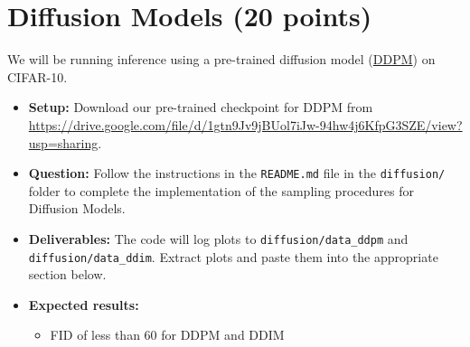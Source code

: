 \documentclass[11pt,addpoints,answers]{exam}
\numberwithin{equation}{section} %
\numberwithin{figure}{section} %
\numberwithin{table}{section} %
\begin{document}
\section{Diffusion Models (20 points)}
We will be running inference using a pre-trained diffusion model (\href{https://arxiv.org/abs/2006.11239}{DDPM}) on CIFAR-10. 
\begin{itemize}
\item \textbf{Setup:} Download our pre-trained checkpoint for DDPM from \href{https://drive.google.com/file/d/1gtn9Jv9jBUol7iJw-94hw4j6KfpG3SZE/view?usp=sharing}{https://drive.google.com/file/d/1gtn9Jv9jBUol7iJw-94hw4j6KfpG3SZE/view?usp=sharing}.
\item \textbf{Question:} Follow the instructions in the \texttt{README.md} file in the \texttt{diffusion/} folder to complete the implementation of the sampling procedures for Diffusion Models.
\item \textbf{Deliverables:} The code will log plots to \texttt{diffusion/data\_ddpm} and \texttt{diffusion/data\_ddim}. Extract plots and paste them into the appropriate section below. 
\item \textbf{Expected results:} 
    \begin{itemize}
        \item FID of less than 60 for DDPM and DDIM
    \end{itemize}
\end{itemize}
\end{document}
